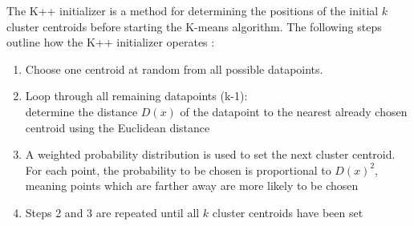 The K++ initializer is a method for determining the positions of the initial $k$ cluster centroids before starting the K-means algorithm. The following steps outline how the K++ initializer operates \cite{arthur2006k}:

\begin{enumerate}
	\item Choose one centroid at random from all possible datapoints.
	\item Loop through all remaining datapoints (k-1):\\
	determine the distance $D(x)$ of the datapoint to the nearest already chosen centroid using the Euclidean distance
	\item A weighted probability distribution is used to set the next cluster centroid. For each point, the probability to be chosen is proportional to $D(x)^2$, meaning points which are farther away are more likely to be chosen
	\item Steps 2 and 3 are repeated until all $k$ cluster centroids have been set
\end{enumerate}
